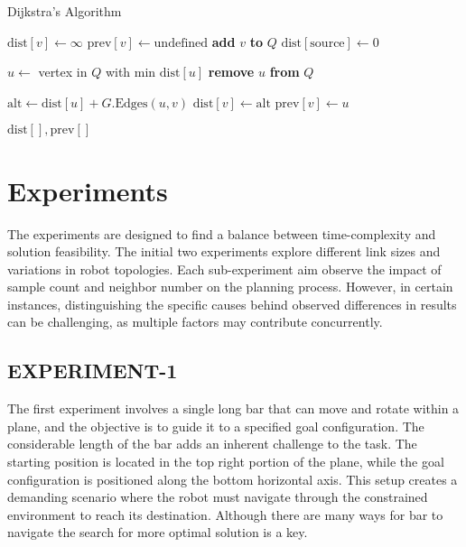 \documentclass{IEEEtaes}
\begin{document}
\begin{algorithm}
\caption{Dijkstra's Algorithm}
\begin{algorithmic}[1]
        \State $\text{dist}[v] \gets \infty$
        \State $\text{prev}[v] \gets \text{undefined}$
        \State \textbf{add} $v$ \textbf{to} $Q$
    \EndFor
    \State $\text{dist}[\text{source}] \gets 0$
    
        \State $u \gets$ vertex in $Q$ with min $\text{dist}[u]$
        \State \textbf{remove} $u$ \textbf{from} $Q$
        
            \State $\text{alt} \gets \text{dist}[u] + G.\text{Edges}(u, v)$
                \State $\text{dist}[v] \gets \text{alt}$
                \State $\text{prev}[v] \gets u$
            \EndIf
        \EndFor
    \EndWhile
    
    \State \Return $\text{dist}[], \text{prev}[]$
\EndFunction
\end{algorithmic}
\end{algorithm}

\vspace{-2.2em}
\section{\large \textbf{Experiments}}
The experiments are designed to find a balance between time-complexity and solution feasibility. The initial two experiments explore different link sizes and variations in robot topologies. Each sub-experiment aim observe the impact of sample count and neighbor number on the planning process. However, in certain instances, distinguishing the specific causes behind observed differences in results can be challenging, as multiple factors may contribute concurrently.

\subsection{\fontsize{10}{13}\selectfont EXPERIMENT-1}
The first experiment involves a single long bar that can move and rotate within a plane, and the objective is to guide it to a specified goal configuration. The considerable length of the bar adds an inherent challenge to the task. The starting position is located in the top right portion of the plane, while the goal configuration is positioned along the bottom horizontal axis. This setup creates a demanding scenario where the robot must navigate through the constrained environment to reach its destination. Although there are many ways for bar to navigate the search for more optimal solution is a key.
\end{document}
